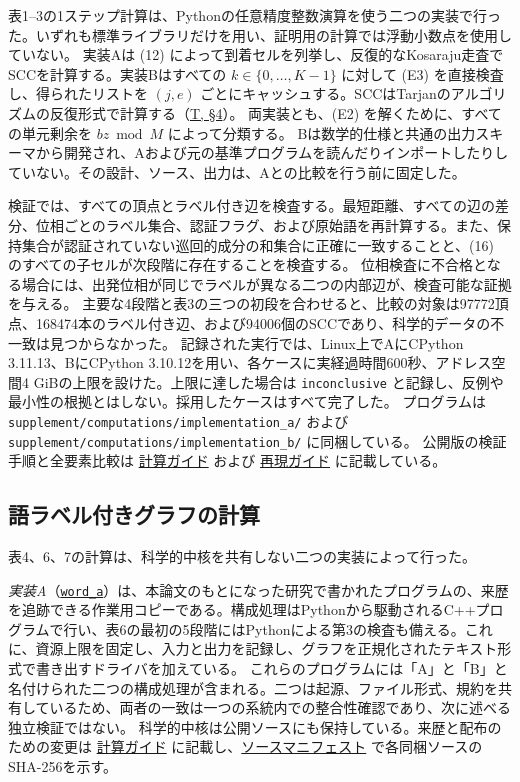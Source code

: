 \documentclass[11pt,reqno]{amsart}
\theoremstyle{definition}
\theoremstyle{definition}
\theoremstyle{remark}
\begin{document}
表1--3の1ステップ計算は、Pythonの任意精度整数演算を使う二つの実装で行った。いずれも標準ライブラリだけを用い、証明用の計算では浮動小数点を使用していない。
実装Aは (12) によって到着セルを列挙し、反復的なKosaraju走査でSCCを計算する。実装Bはすべての \(k\in\{0,\ldots,K-1\}\) に対して (E3) を直接検査し、得られたリストを \((j,e)\) ごとにキャッシュする。SCCはTarjanのアルゴリズムの反復形式で計算する（\hyperref[ref-t]{T, §4}）。
両実装とも、(E2) を解くために、すべての単元剰余を \(bz\bmod M\) によって分類する。
Bは数学的仕様と共通の出力スキーマから開発され、Aおよび元の基準プログラムを読んだりインポートしたりしていない。その設計、ソース、出力は、Aとの比較を行う前に固定した。

検証では、すべての頂点とラベル付き辺を検査する。最短距離、すべての辺の差分、位相ごとのラベル集合、認証フラグ、および原始語を再計算する。また、保持集合が認証されていない巡回的成分の和集合に正確に一致することと、(16) のすべての子セルが次段階に存在することを検査する。
位相検査に不合格となる場合には、出発位相が同じでラベルが異なる二つの内部辺が、検査可能な証拠を与える。
主要な4段階と表3の三つの初段を合わせると、比較の対象は97772頂点、168474本のラベル付き辺、および94006個のSCCであり、科学的データの不一致は見つからなかった。
記録された実行では、Linux上でAにCPython 3.11.13、BにCPython 3.10.12を用い、各ケースに実経過時間600秒、アドレス空間4 GiBの上限を設けた。上限に達した場合は \texttt{inconclusive} と記録し、反例や最小性の根拠とはしない。採用したケースはすべて完了した。
プログラムは \nolinkurl{supplement/computations/implementation_a/} および \nolinkurl{supplement/computations/implementation_b/} に同梱している。
公開版の検証手順と全要素比較は \href{supplement/COMPUTATION.md}{計算ガイド} および \href{REPRODUCE.md}{再現ガイド} に記載している。

\subsection{語ラベル付きグラフの計算}\label{sec:9.3}

表4、6、7の計算は、科学的中核を共有しない二つの実装によって行った。

\emph{実装A}（\href{supplement/COMPUTATION.md}{\nolinkurl{word_a}}）は、本論文のもとになった研究で書かれたプログラムの、来歴を追跡できる作業用コピーである。構成処理はPythonから駆動されるC++プログラムで行い、表6の最初の5段階にはPythonによる第3の検査も備える。これに、資源上限を固定し、入力と出力を記録し、グラフを正規化されたテキスト形式で書き出すドライバを加えている。
これらのプログラムには「A」と「B」と名付けられた二つの構成処理が含まれる。二つは起源、ファイル形式、規約を共有しているため、両者の一致は一つの系統内での整合性確認であり、次に述べる独立検証ではない。
科学的中核は公開ソースにも保持している。来歴と配布のための変更は \href{supplement/COMPUTATION.md}{計算ガイド} に記載し、\href{MANIFEST.json}{ソースマニフェスト} で各同梱ソースのSHA-256を示す。
\end{document}
